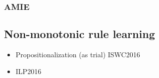 \subsubsection{AMIE}
\subsection{Non-monotonic rule learning}
\begin{itemize}
\item Propositionalization (as trial) ISWC2016
\item ILP2016

\end{itemize}


